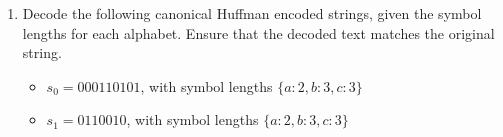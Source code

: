 \documentclass{subfiles}
\begin{document}
\begin{exercises*}
\begin{enumerate}
            \item Decode the following canonical Huffman encoded strings,
                given the symbol lengths for each alphabet. 
                Ensure that the decoded text matches the original string.
                \begin{itemize}
                    \item \(s_{0} = 000110101\), with symbol lengths \(\{a:2, b:3, c:3\}\)
                    \item \(s_{1} = 0110010\), with symbol lengths \(\{a:2, b:3, c:3\}\)
                \end{itemize}
        \end{enumerate}
    \end{exercises*}
    \cleardoublepage
\end{document}

